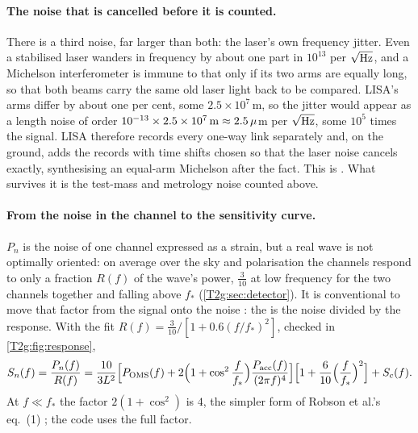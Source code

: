 \paragraph{The noise that is cancelled before it is counted.}
There is a third noise, far larger than both: the laser's own frequency jitter. Even a stabilised laser wanders in frequency by about one part in $10^{13}$ per $\sqrt{\rm Hz}$, and a Michelson interferometer is immune to that only if its two arms are equally long, so that both beams carry the same old laser light back to be compared. LISA's arms differ by about one per cent, some $2.5\times10^7$\,m, so the jitter would appear as a length noise of order $10^{-13}\times2.5\times10^7\,{\rm m}\approx2.5\,\mu$m per $\sqrt{\rm Hz}$, some $10^5$ times the signal. LISA therefore records every one-way link separately and, on the ground, adds the records with time shifts chosen so that the laser noise cancels exactly, synthesising an equal-arm Michelson after the fact. This is . What survives it is the test-mass and metrology noise counted above.

\paragraph{From the noise in the channel to the sensitivity curve.}
$P_n$ is the noise of one channel expressed as a strain, but a real wave is not optimally oriented: on average over the sky and polarisation the channels respond to only a fraction $R(f)$ of the wave's power, $\tfrac{3}{10}$ at low frequency for the two channels together and falling above $f_*$ (\cref{T2g:sec:detector}). It is conventional to move that factor from the signal onto the noise \cite[eq.~(2)]{Robson2019}: the  is the noise divided by the response. With the fit $R(f)=\tfrac3{10}/[1+0.6(f/f_*)^2]$, checked in \cref{T2g:fig:response},
\begin{equation}
  S_n(f)=\frac{P_n(f)}{R(f)}
  =\frac{10}{3L^2}\Big[P_{\rm OMS}(f)+2\Big(1+\cos^2\frac{f}{f_*}\Big)\frac{P_{\rm acc}(f)}{(2\pi f)^4}\Big]\Big[1+\frac{6}{10}\Big(\frac{f}{f_*}\Big)^2\Big]+S_c(f).
  \label{T2a:eq:Sn}
\end{equation}
At $f\ll f_*$ the factor $2(1+\cos^2)$ is $4$, the simpler form of Robson et al.'s eq.~(1) \cite{Robson2019}; the code uses the full factor.

